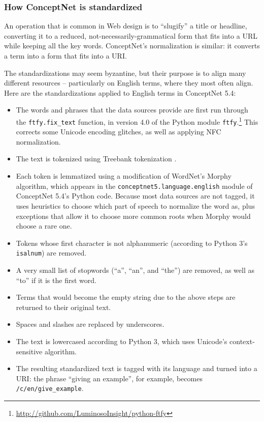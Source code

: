 \documentclass[letterpaper]{article}
\begin{document}
\subsubsection{How ConceptNet is standardized}

An operation that is common in Web design is to ``slugify'' a title or
headline, converting it to a reduced, not-necessarily-grammatical form
that fits into a URL while keeping all the key words. ConceptNet's
normalization is similar: it converts a term into a form that fits into
a URI.

The standardizations may seem byzantine, but their purpose is to align many
different resources -- particularly on English terms, where they most often
align. Here are the standardizations applied to English terms in ConceptNet
5.4:

\begin{itemize}
\item The words and phrases that the data sources provide are first run
    through the {\tt ftfy.fix\_text} function, in version 4.0 of the Python
    module {\tt ftfy}.\footnote{
        \url{http://github.com/LuminosoInsight/python-ftfy}
    } This corrects some Unicode encoding glitches, as well as applying
    NFC normalization.
\item The text is tokenized using Treebank tokenization
    \cite{marcus1993treebank}.
\item Each token is lemmatized using a modification of WordNet's Morphy
    algorithm, which appears in the {\tt conceptnet5.language.english}
    module of ConceptNet 5.4's Python code. Because most data sources are not
    tagged, it uses heuristics to choose which part of speech to normalize
    the word as, plus exceptions that allow it to choose more common roots
    when Morphy would choose a rare one.
\item Tokens whose first character is not alphanumeric (according to Python
    3's {\tt isalnum}) are removed.
\item A very small list of stopwords (``a'', ``an'', and ``the'') are
    removed, as well as ``to'' if it is the first word.
\item Terms that would become the empty string due to the above steps are
    returned to their original text.
\item Spaces and slashes are replaced by underscores.
\item The text is lowercased according to Python 3, which uses Unicode's
    context-sensitive algorithm.
\item The resulting standardized text is tagged with its language and turned
    into a URI: the phrase ``giving an example'', for example, becomes
    {\tt /c/en/give\_example}.
\end{itemize}
\end{document}
